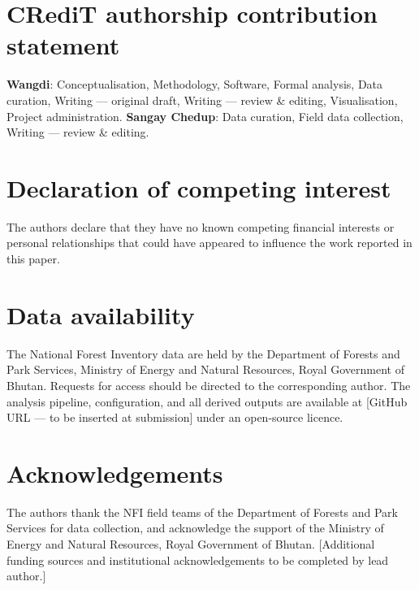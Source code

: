 \documentclass[review,12pt,a4paper]{elsarticle}
\begin{document}
\section*{CRediT authorship contribution statement}

\textbf{Wangdi}: Conceptualisation, Methodology, Software, Formal analysis,
Data curation, Writing --- original draft, Writing --- review \& editing,
Visualisation, Project administration. \textbf{Sangay Chedup}: Data curation,
Field data collection, Writing --- review \& editing.

\section*{Declaration of competing interest}

The authors declare that they have no known competing financial interests or
personal relationships that could have appeared to influence the work reported
in this paper.

\section*{Data availability}

The National Forest Inventory data are held by the Department of Forests and
Park Services, Ministry of Energy and Natural Resources, Royal Government of
Bhutan. Requests for access should be directed to the corresponding author.
The analysis pipeline, configuration, and all derived outputs are available at
[GitHub URL --- to be inserted at submission] under an open-source licence.

\section*{Acknowledgements}

The authors thank the NFI field teams of the Department of Forests and Park
Services for data collection, and acknowledge the support of the Ministry of
Energy and Natural Resources, Royal Government of Bhutan.
[Additional funding sources and institutional acknowledgements to be completed
by lead author.]


\clearpage
\end{document}
